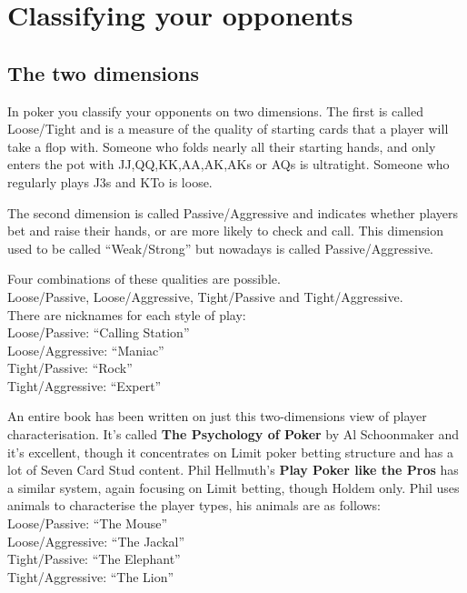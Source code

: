 \chapter{Classifying your opponents}


\section{The two dimensions}

In poker you classify your opponents on two dimensions.
The first is called Loose/Tight and is a measure of the quality
of starting cards that a player will take a flop with. Someone
who folds nearly all their starting hands, and
only enters the pot with JJ,QQ,KK,AA,AK,AKs or AQs is ultratight.
Someone who regularly plays J3s and KTo is loose.

The second dimension is called Passive/Aggressive and indicates
whether players bet and raise their hands, or are more likely
to check and call. This dimension used to be called ``Weak/Strong''
but nowadays is called Passive/Aggressive.

Four combinations of these qualities are possible. \\
Loose/Passive, Loose/Aggressive, Tight/Passive and Tight/Aggressive. \\
There are nicknames for each style of play: \\
Loose/Passive: ``Calling Station'' \\
Loose/Aggressive: ``Maniac'' \\
Tight/Passive: ``Rock'' \\
Tight/Aggressive: ``Expert''


An entire book has been written on just this two-dimensions view
of player characterisation. It's called \textbf{The Psychology of Poker}
by Al Schoonmaker and it's excellent, though it concentrates
on Limit poker betting structure and has a lot of Seven Card Stud
content. Phil Hellmuth's \textbf{Play Poker like the Pros} has a
similar system, again focusing on Limit betting, though Holdem only.
Phil uses animals to characterise the player types, his animals are
as follows: \\
Loose/Passive: ``The Mouse'' \\
Loose/Aggressive: ``The Jackal'' \\
Tight/Passive: ``The Elephant'' \\
Tight/Aggressive: ``The Lion''

